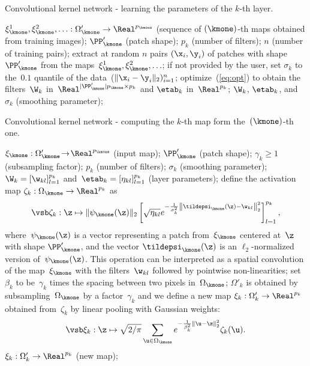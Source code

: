 \begin{algorithm}
   \caption{Convolutional kernel network - learning the parameters of the $k$-th layer.}\label{alg:ckn}
   \begin{algorithmic}[1]
      \INPUT $\xi^1_{\kmone}, \xi^2_{\kmone},\ldots: \Omega'_{\kmone} \to \Real^{p_{\kmone}}$ (sequence of $(\kmone)$-th maps obtained from training images); $\PP_{\kmone}'$ (patch shape); $p_k$ (number of filters); $n$ (number of training pairs);
      \STATE extract at random $n$ pairs $(\x_i,\y_i)$ of patches with shape $\PP_{\kmone}'$ from the maps~$\xi_{\kmone}^1,\xi_{\kmone}^2,\ldots$;
      \STATE if not provided by the user, set $\sigma_k$ to the~$0.1$ quantile of the data~($\|\x_i-\y_i\|_2)_{i=1}^n$;
       optimize~(\ref{eq:opt}) to obtain the filters~$\W_k$ in~$\Real^{|\PP_{\kmone}'|p_{\kmone} \times p_k}$ and $\etab_k$ in~$\Real^{p_k}$;
      \OUTPUT $\W_k$, $\etab_k$, and $\sigma_k$ (smoothing parameter);
   \end{algorithmic}
\end{algorithm}
\begin{algorithm}
   \caption{Convolutional kernel network - computing the $k$-th map form the~$(\kmone)$-th one.}\label{alg:ckn2}
   \begin{algorithmic}[1]
      \INPUT $\xi_{\kmone}: \Omega'_{\kmone} \!\to\! \Real^{p_{\kmone}}$ (input map); $\PP_{\kmone}'$ (patch shape); $\gamma_k \!\geq \!1$ (subsampling factor); $p_k$ (number of filters); $\sigma_k$ (smoothing parameter); $\W_k=[\w_{kl}]_{l=1}^{p_k}$ and~$\etab_k=[\eta_{kl}]_{l=1}^{p_k}$ (layer parameters);
       define the activation map $\zeta_k: \Omega_{\kmone} \to \Real^{p_k}$ as
      \begin{equation}
         \vsb
         \zeta_k: \z \mapsto \|\psi_{\kmone}(\z)\|_2 \left[\sqrt{\eta_{kl}} e^{-\frac{1}{\sigma_k^2}\left\|\tildepsi_{\kmone}(\z)-\w_{kl}\right\|_2^2}\right]_{l=1}^{p_k}, \label{eq:zeta}
      \end{equation}
      where~$\psi_{\kmone}(\z)$ is a vector representing a patch from~$\xi_{\kmone}$ centered at~$\z$ with shape $\PP_{\kmone}'$, and the vector $\tildepsi_{\kmone}(\z)$ is an $\ell_2$-normalized version of~$\psi_{\kmone}(\z)$. This operation can be interpreted as a spatial convolution of the map~$\xi_{\kmone}$ with the filters~$\w_{kl}$ followed by pointwise non-linearities;
      \STATE set~$\beta_k$ to be~$\gamma_k$ times the spacing between two pixels in~$\Omega_{\kmone}$;
      $\Omega'_k$ is obtained by subsampling~$\Omega_{\kmone}$ by a factor~$\gamma_k$ and we define a    
      new map $\xi_{k}: \Omega'_k \to \Real^{p_k}$ obtained from~$\zeta_k$ by linear pooling with Gaussian weights:
      \begin{equation}
         \vsb
         \xi_k: \z \mapsto \sqrt{{2}/\pi}\sum_{\u \in \Omega_{\kmone}}  e^{-\frac{1}{\beta_k^2}\left\|\u - \z\right\|_2^2} \zeta_k(\u). \label{eq:xi}
      \end{equation}
      \OUTPUT $\xi_{k} : \Omega'_k \to \Real^{p_k}$ (new map);
   \end{algorithmic}
\end{algorithm}

